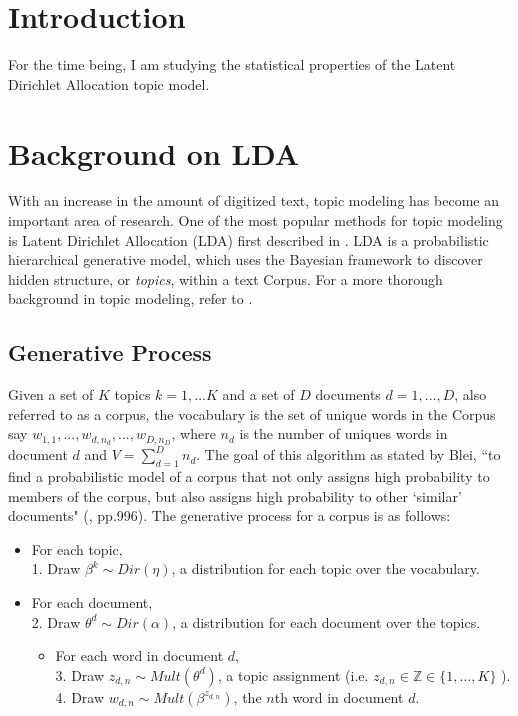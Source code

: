 \documentclass[3p,times]{elsarticle}
\begin{document}





\section{Introduction}
For the time being, I am studying the statistical properties of the Latent Dirichlet Allocation topic model.

\section{Background on LDA}
With an increase in the amount of digitized text, topic modeling has become an important area of research. One of the most popular methods for topic modeling is Latent Dirichlet Allocation (LDA) first described in \cite{lda}. LDA is a probabilistic hierarchical generative model, which uses the Bayesian framework to discover hidden structure, or \textit{topics},  within a text Corpus. For a more thorough background in topic modeling, refer to \cite{news}.

\subsection{Generative Process}
Given a set of $K$ topics $k=1,...K$ and a set of $D$ documents $d=1,...,D$, also referred to as a corpus, the vocabulary is the set of unique words in the Corpus say $w_{1,1},...,w_{d,n_{d}},...,w_{D,n_{D}}$, where $n_{d}$ is the number of uniques words in document $d$ and $V=\sum_{d=1}^{D}{n_{d}}$. The goal of this algorithm as stated by Blei, ``to find a probabilistic model of a corpus that not only assigns high probability to members of the corpus, but also assigns high probability to other `similar' documents" (\cite{lda}, pp.996). The generative process for a corpus is as follows:
\begin{itemize}
	\item For each topic, \\
	1. Draw $\beta^{k} \sim Dir(\eta)$, a distribution for each topic over the vocabulary.
	
	\item For each document, \\
	2. Draw $\theta^{d} \sim Dir(\alpha)$, a distribution for each document over the topics.		\begin{itemize}
		\item For each word in document $d$, \\
		3. Draw $z_{d,n} \sim Mult(\theta^{d})$, a topic assignment (i.e. $z_{d,n} \in \mathbb{Z} \in \{1,...,K\}$ ). \\
		4. Draw $w_{d,n} \sim Mult(\beta^{z_{d,n}})$, the $n$th word in document $d$.
	\end{itemize}
\end{itemize}
\end{document}
